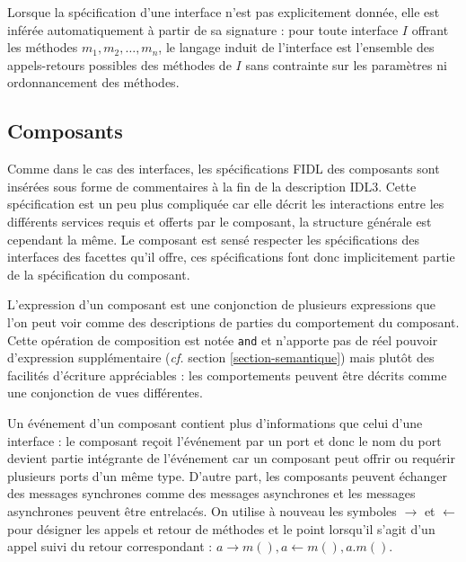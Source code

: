 Lorsque la sp\'ecification d'une interface n'est pas explicitement
donn\'ee, elle est inf\'er\'ee automatiquement \`a partir de sa
signature : pour toute interface $I$ offrant les m\'ethodes
$m_1,m_2,\dots,m_n$, le langage induit de l'interface est l'ensemble
des appels-retours possibles des m\'ethodes de $I$ sans contrainte
sur les param\`etres ni ordonnancement des m\'ethodes.

\subsection{Composants}

Comme dans le cas des interfaces, les sp\'ecifications \textsf{FIDL} des
composants sont ins\'er\'ees sous forme de commentaires \`a la fin de la
description \textsf{IDL3}. Cette sp\'ecification est un peu plus compliqu\'ee car
elle d\'ecrit les interactions entre les diff\'erents services requis et
offerts par le composant, la structure g\'en\'erale est cependant la
m\^eme. Le composant est sens\'e respecter les sp\'ecifications des
interfaces des facettes qu'il offre, ces sp\'ecifications font donc
implicitement partie de la sp\'ecification du composant. 

L'expression d'un composant est une conjonction de plusieurs expressions que l'on peut
voir comme des descriptions de parties du comportement du
composant. Cette op\'eration de \og composition\fg{} est not\'ee
\texttt{and} et n'apporte pas de r\'eel pouvoir d'expression
suppl\'ementaire  (\emph{cf.} section \ref{section-semantique}) mais plut\^ot des facilit\'es d'\'ecriture appr\'eciables : les
comportements peuvent \^etre d\'ecrits comme une conjonction de vues
diff\'erentes.

Un \'ev\'enement d'un composant contient plus d'informations que celui
d'une interface : le composant re\c{c}oit l'\'ev\'enement par un port et donc
le nom du port devient partie int\'egrante de l'\'ev\'enement car
un composant peut offrir ou requ\'erir plusieurs ports d'un m\^eme type. D'autre part,
les composants peuvent \'echanger des messages synchrones comme des
messages asynchrones et les messages asynchrones peuvent \^etre
entrelac\'es. On
utilise \`a nouveau les symboles $\rightarrow$ et $\leftarrow$ pour
d\'esigner les appels et retour de m\'ethodes et le point lorsqu'il s'agit
d'un appel suivi du retour correspondant : $a\rightarrow m(),
a\leftarrow m(), a.m()$. 


